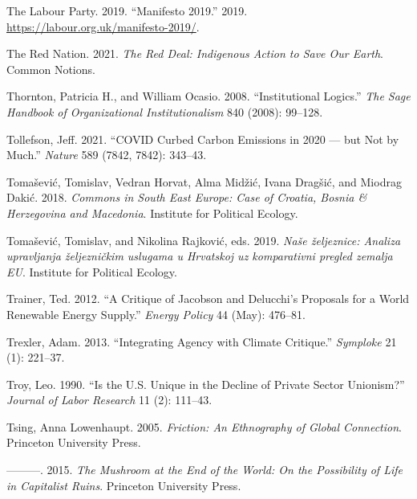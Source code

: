 \documentclass[a4paper, nobind]{templates/ociamthesis}
\newlength{\cslhangindent}
\newenvironment{CSLReferences}[2] %
 {%
  \setlength{\parindent}{0pt}
  \ifodd #1
  \let\oldpar\par
  \def\par{\hangindent=\cslhangindent\oldpar}
  \fi
  \setlength{\parskip}{1mm}
  \setlength{\baselineskip}{6mm}
 }%
 {}
\begin{document}
\begin{CSLReferences}{1}{0}
\leavevmode{}%
The Labour Party. 2019. {``Manifesto 2019.''} 2019. \url{https://labour.org.uk/manifesto-2019/}.

\leavevmode{}%
The Red Nation. 2021. \emph{The {Red Deal}: {Indigenous Action} to {Save Our Earth}}. {Common Notions}.

\leavevmode{}%
Thornton, Patricia H., and William Ocasio. 2008. {``Institutional Logics.''} \emph{The Sage Handbook of Organizational Institutionalism} 840 (2008): 99--128.

\leavevmode{}%
Tollefson, Jeff. 2021. {``{COVID} Curbed Carbon Emissions in 2020 --- but Not by Much.''} \emph{Nature} 589 (7842, 7842): 343--43.

\leavevmode{}%
Tomašević, Tomislav, Vedran Horvat, Alma Midžić, Ivana Dragšić, and Miodrag Dakić. 2018. \emph{Commons in {South East Europe}: {Case} of {Croatia}, {Bosnia} \& {Herzegovina} and {Macedonia}}. {Institute for Political Ecology}.

\leavevmode{}%
Tomašević, Tomislav, and Nikolina Rajković, eds. 2019. \emph{Naše željeznice: Analiza upravljanja željezničkim uslugama u Hrvatskoj uz komparativni pregled zemalja EU}. {Institute for Political Ecology}.

\leavevmode{}%
Trainer, Ted. 2012. {``A Critique of {Jacobson} and {Delucchi}'s Proposals for a World Renewable Energy Supply.''} \emph{Energy Policy} 44 (May): 476--81.

\leavevmode{}%
Trexler, Adam. 2013. {``Integrating Agency with Climate Critique.''} \emph{Symploke} 21 (1): 221--37.

\leavevmode{}%
Troy, Leo. 1990. {``Is the {U}.{S}. Unique in the Decline of Private Sector Unionism?''} \emph{Journal of Labor Research} 11 (2): 111--43.

\leavevmode{}%
Tsing, Anna Lowenhaupt. 2005. \emph{Friction: {An Ethnography} of {Global Connection}}. {Princeton University Press}.

\leavevmode{}%
---------. 2015. \emph{The {Mushroom} at the {End} of the {World}: {On} the {Possibility} of {Life} in {Capitalist Ruins}}. {Princeton University Press}.


\end{CSLReferences}
\end{document}
